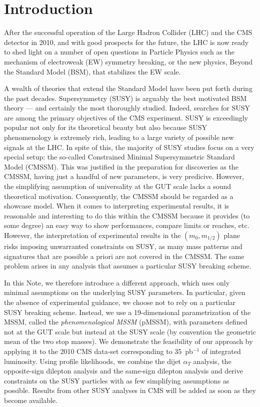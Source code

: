\section{Introduction}
\label{sec:intro}

After the successful operation of the Large Hadron Collider (LHC) and the CMS detector
in 2010, and with good prospects for the future, the LHC is now ready to shed light on a number 
of open questions in Particle Physics 
such as the mechanism of electroweak (EW) symmetry breaking, or the 
new physics, Beyond the Standard Model (BSM), that stabilizes the EW scale. 

A wealth of theories that extend the Standard Model have been put forth during the past decades. Supersymmetry (SUSY) is
arguably the best motivated BSM theory --- and certainly the most 
thoroughly studied. 
Indeed, searches for SUSY are among the primary objectives of the 
CMS experiment. SUSY is exceedingly popular not 
only for its theoretical beauty but also because SUSY phenomenology 
is extremely rich, 
leading to a large variety of possible new signals at the LHC. 
In spite of this, the majority of SUSY studies focus on a very special 
setup: the so-called Constrained Minimal Supersymmetric Standard Model (CMSSM). 
This was justified in the preparation for discoveries as the CMSSM, 
having just a handful of new parameters, is very predicive. However, 
the simplifying assumption of universality at the GUT scale lacks a sound 
theoretical motivation. Consequently, the CMSSM should be regarded as a showcase 
model. When it comes to interpreting experimental results, it is reasonable and interesting to do this within the CMSSM because it 
provides (to some degree) an easy way to show performances, 
compare limits or reaches, etc. However, the interpretation of experimental results in the 
$(m_0,m_{1/2})$ plane risks imposing unwarranted constraints on SUSY, as many 
mass patterns and signatures that are possible a priori are not covered in the CMSSM. 
The same problem arises in any analysis that assumes a particular 
SUSY breaking scheme. 

In this Note, we therefore introduce a different approach, which uses only 
minimal assumptions on the underlying SUSY parameters. In particular, given the absence of experimental guidance, we choose
not to rely on a particular SUSY breaking scheme.
Instead, we use a 19-dimensional 
parametrization of the MSSM, called the \emph{phenomenological MSSM} (pMSSM),
with parameters defined not at the GUT scale but instead at the SUSY scale 
(by convention the geometric mean of the two stop masses).
We demonstrate the feasibility of our approach by applying it to 
the 2010 CMS data-set corresponding to 35~pb$^{-1}$ of integrated luminosity.  
Using profile likelihoods, we combine 
the dijet $\alpha_T$ analysis, the opposite-sign dilepton 
analysis and the same-sign dilepton analysis and derive constraints 
on the SUSY particles with as few simplifying assumptions as possible.
Results from other SUSY analyses in CMS will be added as soon as they become available.

